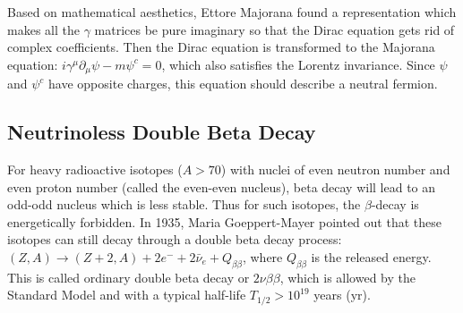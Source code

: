 Based on mathematical aesthetics, Ettore Majorana found a representation which makes all the $\gamma$ matrices be pure imaginary so that the Dirac equation gets rid of complex coefficients\cite{majorana2006symmetric}. Then the Dirac equation is transformed to the Majorana equation: $i\gamma^\mu\partial_\mu\psi-m\psi^c=0$, which also satisfies the Lorentz invariance\cite{zee2010quantum}. Since $\psi$ and $\psi^c$ have opposite charges, this equation should describe a neutral fermion\cite{zee2010quantum}. 
\subsection{Neutrinoless Double Beta Decay}
For heavy radioactive isotopes ($A>70$) with nuclei of even neutron number and even proton number (called the even-even nucleus), beta decay will lead to an odd-odd nucleus which is less stable. Thus for such isotopes, the $\beta$-decay is energetically forbidden. In 1935, Maria Goeppert-Mayer pointed out that these isotopes can still decay through a double beta decay process: $(Z,A) \to (Z+2,A)+2e^{-}+2\bar{\nu}_e+Q_{\beta\beta}$, where $Q_{\beta\beta}$ is the released energy. This is called ordinary double beta decay or $2\nu\beta\beta$, which is allowed by the Standard Model and with a typical half-life $T_{1/2}>10^{19}$ years (yr)\cite{povh2008particles,martin2019nuclear}.

